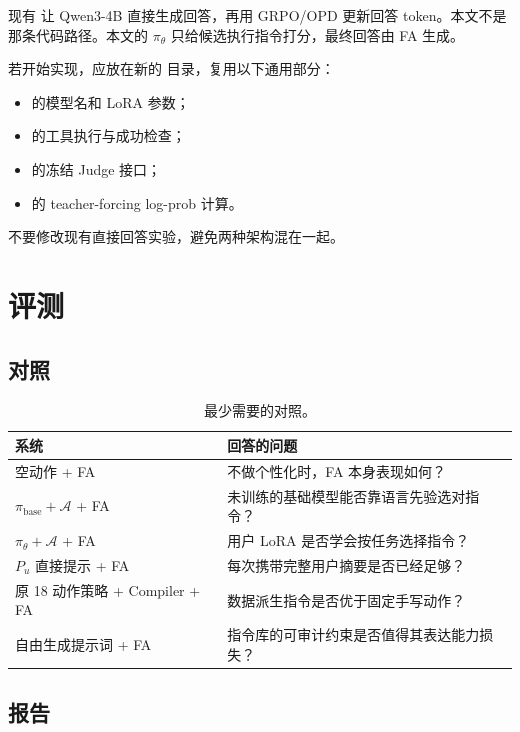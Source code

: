 \documentclass[11pt,UTF8,fontset=fandol]{ctexart}
\newcommand{\policy}{\pi_{\theta}}
\newcommand{\basepolicy}{\pi_{\mathrm{base}}}
\begin{document}
现有  让 Qwen3-4B 直接生成回答，再用 GRPO/OPD 更新回答
token。本文不是那条代码路径。本文的 \(\policy\) 只给候选执行指令打分，最终回答由 FA
生成。

若开始实现，应放在新的  目录，复用以下通用部分：
\begin{itemize}
  \item {} 的模型名和 LoRA 参数；
  \item {} 的工具执行与成功检查；
  \item {} 的冻结 Judge 接口；
  \item {} 的 teacher-forcing log-prob 计算。
\end{itemize}
不要修改现有直接回答实验，避免两种架构混在一起。

\section{评测}

\subsection{对照}

\begin{table}[ht]
  \centering
  \caption{最少需要的对照。}
  \begin{tabularx}{\textwidth}{@{}L{0.30\textwidth}Y@{}}
    \toprule
    系统 & 回答的问题 \\
    \midrule
    空动作 + FA &
    不做个性化时，FA 本身表现如何？ \\
    \(\basepolicy+\mathcal A\) + FA &
    未训练的基础模型能否靠语言先验选对指令？ \\
    \(\policy+\mathcal A\) + FA &
    用户 LoRA 是否学会按任务选择指令？ \\
    \(P_u\) 直接提示 + FA &
    每次携带完整用户摘要是否已经足够？ \\
    原 18 动作策略 + Compiler + FA &
    数据派生指令是否优于固定手写动作？ \\
    自由生成提示词 + FA &
    指令库的可审计约束是否值得其表达能力损失？ \\
    \bottomrule
  \end{tabularx}
\end{table}

\subsection{报告}
\end{document}
